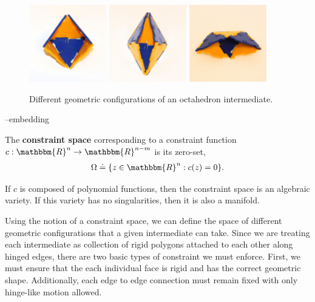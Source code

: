 \begin{figure}[ht]
       \centering
                \includegraphics[width=0.3\textwidth]{images/OctaGCS_0.eps}
                \includegraphics[width=0.3\textwidth]{images/OctaGCS_1.eps}
                \includegraphics[width=0.3\textwidth]{images/OctaGCS_2.eps}

\caption{Different geometric configurations of an octahedron intermediate.}
\label{fig:OctaGCS}
\end{figure}
--embedding

\begin{mydef}
The \textbf{constraint space} corresponding to a constraint function $c: \mathbbm{R}^n \to \mathbbm{R}^{n-m}$ is its zero-set,
\begin{align}
\Omega \doteq \{z \in \mathbbm{R}^n : c(z) = 0\}.
\end{align}
\end{mydef}
If $c$ is composed of polynomial functions, then the constraint space is an algebraic variety. If this variety has no singularities, then it is also a manifold. 

Using the notion of a constraint space, we can define the space of different geometric configurations that a given intermediate can take. Since we are treating each intermediate as collection of rigid polygons attached to each other along hinged edges, there are two basic types of constraint we must enforce. First, we must ensure that the each individual face is rigid and has the correct geometric shape. Additionally, each edge to edge connection must remain fixed with only hinge-like motion allowed. 
   

